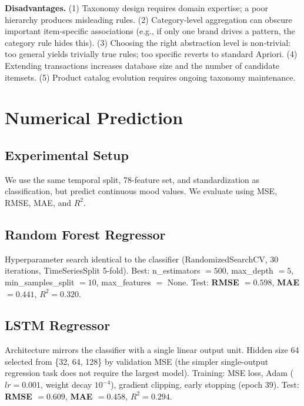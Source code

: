 \documentclass[runningheads]{llncs}
\begin{document}
\textbf{Disadvantages.} (1) Taxonomy design requires domain expertise; a poor hierarchy produces misleading rules. (2) Category-level aggregation can obscure important item-specific associations (e.g., if only one brand drives a pattern, the category rule hides this). (3) Choosing the right abstraction level is non-trivial: too general yields trivially true rules; too specific reverts to standard Apriori. (4) Extending transactions increases database size and the number of candidate itemsets. (5) Product catalog evolution requires ongoing taxonomy maintenance.

\section{Numerical Prediction}

\subsection{Experimental Setup}

We use the same temporal split, 78-feature set, and standardization as classification, but predict continuous mood values. We evaluate using MSE, RMSE, MAE, and $R^2$.

\subsection{Random Forest Regressor}

Hyperparameter search identical to the classifier (RandomizedSearchCV, 30 iterations, TimeSeriesSplit 5-fold). Best: n\_estimators $= 500$, max\_depth $= 5$, min\_samples\_split $= 10$, max\_features $=$ None. Test: \textbf{RMSE $= 0.598$}, \textbf{MAE $= 0.441$}, \textbf{$R^2 = 0.320$}.

\subsection{LSTM Regressor}

Architecture mirrors the classifier with a single linear output unit. Hidden size 64 selected from \{32, 64, 128\} by validation MSE (the simpler single-output regression task does not require the largest model). Training: MSE loss, Adam ($lr = 0.001$, weight decay $10^{-4}$), gradient clipping, early stopping (epoch 39). Test: \textbf{RMSE $= 0.609$}, \textbf{MAE $= 0.458$}, \textbf{$R^2 = 0.294$}.
\end{document}
